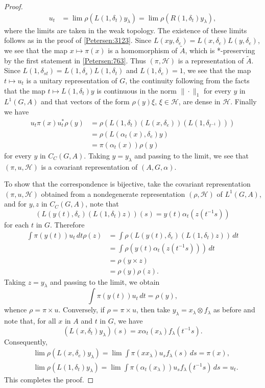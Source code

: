 \documentclass{book}
\begin{document}
\begin{proof}
\begin{align*}
    u_t&=\lim\rho(L(1,\delta_t)y_\lambda)=\lim\rho(R(1,\delta_t)y_\lambda),
  \end{align*}
  where the limits are taken in the weak topology. The existence of these limits follows as in the proof of \ref{Petersen:3123}.
  Since \(L(xy,\delta_e)=L(x,\delta_e)L(y,\delta_e)\), we see that the map \(x\mapsto \pi(x)\) is a homomorphism of \(\tilde{A}\), which is *-preserving by
  the first statement in \ref{Petersen:763}. Thus \((\pi,\mathcal{H})\) is a representation of \(\tilde{A}\).
  Since \(L(1,\delta_{st})=L(1,\delta_s)L(1,\delta_t)\) and \(L(1,\delta_e)=1\), we see that the map \(t\mapsto u_t\)
  is a unitary representation of \(G\), the continuity following from the facts that the map \(t\mapsto L(1,\delta_t)y\) is continuous in the norm \(\|\cdot\|_1\)
  for every \(y\) in \(L^1(G,A)\) and that vectors of the form \(\rho(y)\xi\), \(\xi\in\mathcal{H}\), are dense in \(\mathcal{H}\).
  Finally we have
  \begin{align*}
    u_t\pi(x)u_t^*\rho(y)&=\rho(L(1,\delta_t)(L(x,\delta_e))(L(1,\delta_{t^{-1}})))\\
    &=\rho(L(\alpha_t(x),\delta_e)y)\\
    &=\pi(\alpha_t(x))\rho(y)
  \end{align*}
  for every \(y\) in \(C_C(G,A)\). Taking \(y=y_\lambda\) and passing to the limit, we see that \((\pi,u,\mathcal{H})\) is a covariant representation of \((A,G,\alpha)\).\par
  To show that the correspondence is bijective, take the covariant representation \((\pi,u,\mathcal{H})\) obtained from a nondegenerate
  representation \((\rho,\mathcal{H})\) of \(L^1(G,A)\), and for \(y,z\) in \(C_C(G,A)\), note that
  \[
    (L(y(t),\delta_e)(L(1,\delta_t)z))(s)=y(t)\alpha_t(z(t^{-1}s))
  \]
  for each \(t\) in \(G\). Therefore
  \begin{align*}
    \int\pi(y(t))u_t\,dt\rho(z)&=\int\rho(L(y(t),\delta_e)(L(1,\delta_t)z))\,dt\\
    &=\int\rho(y(t)\alpha_t(z(t^{-1}s)))\,dt\\
    &=\rho(y\times z)\\
    &=\rho(y)\rho(z).
  \end{align*}
  Taking \(z=y_\lambda\) and passing to the limit, we obtain 
  \[
    \int\pi(y(t))u_t\,dt=\rho(y),
  \]
  whence \(\rho=\pi\times u\). Conversely, if \(\rho=\pi\times u\), then take \(y_\lambda=x_\lambda\otimes f_\lambda\) as before and note that, for all \(x\) in \(A\)
  and \(t\) in \(G\), we have
  \[
    (L(x,\delta_t)y_\lambda)(s)=x\alpha_t(x_\lambda)f_\lambda(t^{-1}s).
  \]
  Consequently,
  \begin{align*}
    &\lim\rho(L(x,\delta_e)y_\lambda)=\lim\int\pi(x x_\lambda)u_s f_\lambda(s)\,ds=\pi(x),\\
    &\lim\rho(L(1,\delta_t)y_\lambda)=\lim\int\pi(\alpha_t(x_\lambda))u_s f_\lambda(t^{-1}s)\,ds=u_t.
  \end{align*}
  This completes the proof.
\end{proof}
\end{document}
